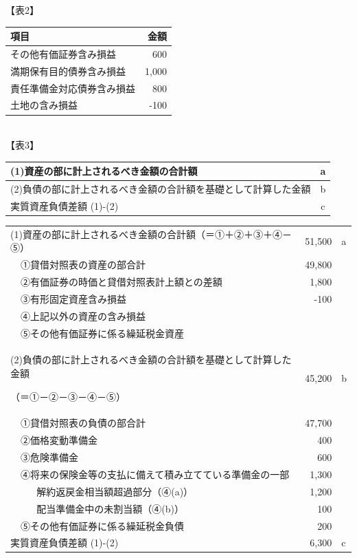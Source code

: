 \documentclass[report,gutter=10mm,fore-edge=10mm,uplatex,dvipdfmx]{jlreq}
\begin{document}
【表2】\\
\begin{tabular}{|l|l|r|}
 \hline
 \multicolumn{2}{|l|}{項目}&金額 \\ \hline
 \hline
 \multicolumn{2}{|l|}{その他有価証券含み損益}&600 \\ \hline
 \multicolumn{2}{|l|}{満期保有目的債券含み損益}&1,000 \\ \hline
 \multicolumn{2}{|l|}{責任準備金対応債券含み損益}&800 \\ \hline
 \multicolumn{2}{|l|}{土地の含み損益}&-100 \\ \hline
 \end{tabular}\\

【表3】\\
\begin{tabular}{|l|c|}
\hline
 (1)資産の部に計上されるべき金額の合計額& a\\ \hline
(2)負債の部に計上されるべき金額の合計額を基礎として計算した金額 & b\\ \hline
 実質資産負債差額 (1)-(2)& c\\ \hline
\end{tabular}

\answer{}

\begin{tabular}{|l|l|l|r|l}
\cline{1-4}
\multicolumn{3}{|l|}{
 (1)資産の部に計上されるべき金額の合計額（＝①＋②＋③＋④－⑤）} & 51,500 & a\\ \cline{2-4}
 & \multicolumn{2}{|l|}{①貸借対照表の資産の部合計} & 49,800 &\\ \cline{1-4}
 & \multicolumn{2}{|l|}{②有価証券の時価と貸借対照表計上額との差額} & 1,800 &\\ \cline{2-4}
 & \multicolumn{2}{|l|}{③有形固定資産含み損益} & -100 &\\ \cline{2-4}
 & \multicolumn{2}{|l|}{④上記以外の資産の含み損益} & &\\ \cline{2-4}
 & \multicolumn{2}{|l|}{⑤その他有価証券に係る繰延税金資産} & &\\ \cline{1-4}
\multicolumn{3}{|l|}{
(2)負債の部に計上されるべき金額の合計額を基礎として計算した金額\par 
（＝①－②－③－④－⑤）}  & 45,200 & b \\ \cline{2-4}
 & \multicolumn{2}{|l|}{①貸借対照表の負債の部合計} & 47,700 &\\ \cline{2-4}
 & \multicolumn{2}{|l|}{②価格変動準備金} & 400 &\\ \cline{2-4}
 & \multicolumn{2}{|l|}{③危険準備金} & 600 &\\ \cline{2-4}
 & \multicolumn{2}{|l|}{④将来の保険金等の支払に備えて積み立てている準備金の一部} & 1,300 &\\ \cline{3-4}
 & & 解約返戻金相当額超過部分（④(a)）& 1,200 &\\ \cline{3-4}
 & & 配当準備金中の未割当額（④(b)）& 100 &\\ \cline{2-4}
 & \multicolumn{2}{|l|}{⑤その他有価証券に係る繰延税金負債} & 200 &\\ \cline{1-4}
 \multicolumn{3}{|l|}{実質資産負債差額 (1)-(2)} & 6,300 &c\\ \cline{1-4}
\end{tabular}
\end{document}
